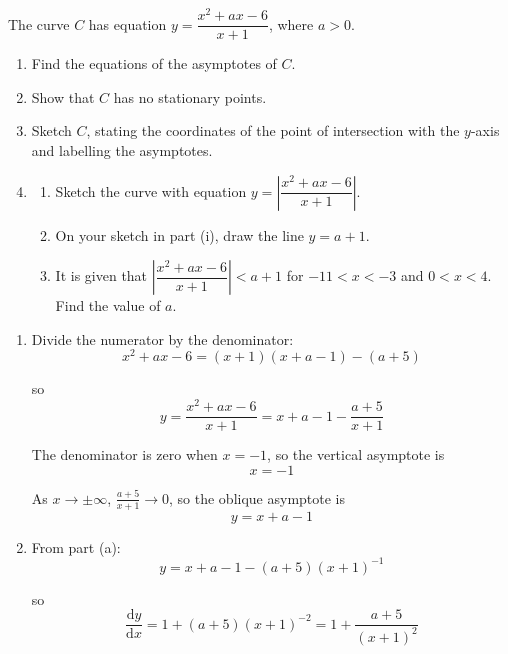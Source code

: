 \documentclass[leqno]{article}
\begin{document}
\begin{enumerate}[
  label=\textbf{\arabic*.},
  leftmargin=*,
  topsep=0pt,
  partopsep=0pt,
  parsep=0pt
]
\questionitem

The curve $C$ has equation $y = \dfrac{x^2 + ax - 6}{x + 1}$, where $a > 0$. \\
\begin{enumerate}[label=\textbf{(\alph*)}]
  \item Find the equations of the asymptotes of $C$.  \\
  \item Show that $C$ has no stationary points.  \\
  \item Sketch $C$, stating the coordinates of the point of intersection with the $y$-axis and labelling the asymptotes.  \\
  \item
  \begin{enumerate}[label=(\roman*)]
    \item Sketch the curve with equation $y = \left|\dfrac{x^2 + ax - 6}{x + 1}\right|$. 
    \item On your sketch in part (i), draw the line $y = a + 1$. 
    \item It is given that $\left|\dfrac{x^2 + ax - 6}{x + 1}\right| < a + 1$ for $-11 < x < -3$ and $0 < x < 4$. \\
    Find the value of $a$. 
  \end{enumerate}
\end{enumerate}

\vspace*{10pt}

\begin{djsSolution}
\begin{enumerate}[label=\textbf{(\alph*)}]
  \item Divide the numerator by the denominator:
  \[
  x^2+ax-6=(x+1)(x+a-1)-(a+5)
  \]

  so
  \[
  y=\frac{x^2+ax-6}{x+1}=x+a-1-\frac{a+5}{x+1}
  \]

  The denominator is zero when \(x=-1\), so the vertical asymptote is
  \[
  x=-1
  \]

  As \(x\to\pm\infty\), \(\frac{a+5}{x+1}\to 0\), so the oblique asymptote is
  \[
  y=x+a-1
  \]

  \item From part (a):
  \[
  y=x+a-1-(a+5)(x+1)^{-1}
  \]

  so
  \[
  \frac{\mathrm{d}y}{\mathrm{d}x}=1+(a+5)(x+1)^{-2}
  =1+\frac{a+5}{(x+1)^2}
  \]


\end{enumerate}
\end{djsSolution}
\end{enumerate}
\end{document}
